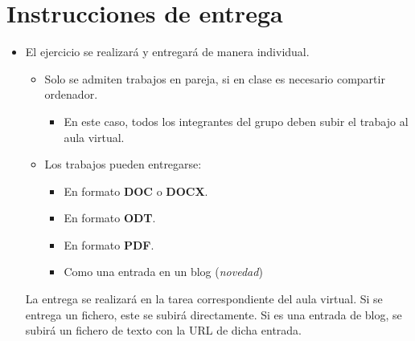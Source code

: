 \section{Instrucciones de entrega}
\begin{itemize}
\item El ejercicio se realizará y entregará de manera individual.
  \begin{itemize}
  \item Solo se admiten trabajos en pareja, si en clase es necesario compartir ordenador.
    \begin{itemize}
    \item En este caso, todos los integrantes del grupo deben subir el trabajo al aula virtual.
    \end{itemize}


  \item Los trabajos pueden entregarse:
    \begin{itemize}
    \item En formato \textbf{DOC} o \textbf{DOCX}.
    \item En formato \textbf{ODT}.
    \item En formato \textbf{PDF}. 
    \item Como una entrada en un blog (\textit{novedad})  
    \end{itemize}
  \end{itemize}

  La entrega se realizará en la tarea correspondiente del aula virtual. Si se entrega un fichero, este se subirá directamente. Si es una entrada de blog, se subirá un fichero de texto con la URL de dicha entrada.

  
\end{itemize}


